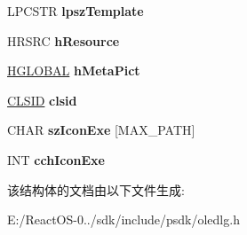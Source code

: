 \begin{DoxyCompactItemize}
\item 
\mbox{\label{structtag_o_l_e_u_i_c_h_a_n_g_e_i_c_o_n_a_a147d1d58d495f5bbc62e3bec2e382868}} 
L\+P\+C\+S\+TR {\bfseries lpsz\+Template}
\item 
\mbox{\label{structtag_o_l_e_u_i_c_h_a_n_g_e_i_c_o_n_a_a00d20db2ba988c16f7f2d70d31abe511}} 
H\+R\+S\+RC {\bfseries h\+Resource}
\item 
\mbox{\label{structtag_o_l_e_u_i_c_h_a_n_g_e_i_c_o_n_a_add393cf8c48d1088ef94d8b09ded0200}} 
\hyperlink{interfacevoid}{H\+G\+L\+O\+B\+AL} {\bfseries h\+Meta\+Pict}
\item 
\mbox{\label{structtag_o_l_e_u_i_c_h_a_n_g_e_i_c_o_n_a_af8f90a689a58c524e85e5d8b282bdfbc}} 
\hyperlink{struct___i_i_d}{C\+L\+S\+ID} {\bfseries clsid}
\item 
\mbox{\label{structtag_o_l_e_u_i_c_h_a_n_g_e_i_c_o_n_a_ad06324c40cb4dbfd56ec53499ffd8a94}} 
C\+H\+AR {\bfseries sz\+Icon\+Exe} \mbox{[}M\+A\+X\+\_\+\+P\+A\+TH\mbox{]}
\item 
\mbox{\label{structtag_o_l_e_u_i_c_h_a_n_g_e_i_c_o_n_a_a9815a1e76b57c9c18355db4df8ef96ab}} 
I\+NT {\bfseries cch\+Icon\+Exe}
\end{DoxyCompactItemize}


该结构体的文档由以下文件生成\+:\begin{DoxyCompactItemize}
\item 
E\+:/\+React\+O\+S-\/0../sdk/include/psdk/oledlg.\+h\end{DoxyCompactItemize}
